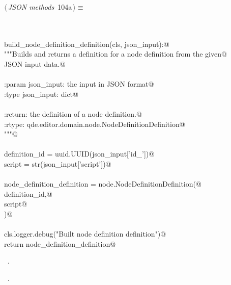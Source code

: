 \documentclass[
    a4paper,      %
    10pt,         %
    openright,    %
    notitlepage,  %
    parskip=half, %
]{scrreprt}       %
\theoremstyle{definition}                    %
\begin{document}
\begin{flushleft} \small
\begin{minipage}{\linewidth}\label{scrap169}\raggedright\small
{} $\langle\,${\itshape JSON methods}\nobreak\ {\footnotesize {104a}}$\,\rangle\equiv$
\vspace{-1exm}
\begin{list}{}{} \item
\mbox{}\lstinline@@\\
\mbox{}\lstinline@classmethod@\\
\mbox{}\lstinline@def build_node_definition_definition(cls, json_input):@\\
\mbox{}\lstinline@    """Builds and returns a definition for a node definition from the given@\\
\mbox{}\lstinline@    JSON input data.@\\
\mbox{}\lstinline@@\\
\mbox{}\lstinline@    :param json_input: the input in JSON format@\\
\mbox{}\lstinline@    :type  json_input: dict@\\
\mbox{}\lstinline@@\\
\mbox{}\lstinline@    :return: the definition of a node definition.@\\
\mbox{}\lstinline@    :rtype:  qde.editor.domain.node.NodeDefinitionDefinition@\\
\mbox{}\lstinline@    """@\\
\mbox{}\lstinline@@\\
\mbox{}\lstinline@    definition_id = uuid.UUID(json_input['id_'])@\\
\mbox{}\lstinline@    script        = str(json_input['script'])@\\
\mbox{}\lstinline@@\\
\mbox{}\lstinline@    node_definition_definition = node.NodeDefinitionDefinition(@\\
\mbox{}\lstinline@        definition_id,@\\
\mbox{}\lstinline@        script@\\
\mbox{}\lstinline@    )@\\
\mbox{}\lstinline@@\\
\mbox{}\lstinline@    cls.logger.debug("Built node definition definition")@\\
\mbox{}\lstinline@    return node_definition_definition@\\
\mbox{}\lstinline@@{\NWsep}
\end{list}
\vspace{-1.5ex}
\footnotesize
\begin{list}{}{\setlength{\itemsep}{-\parsep}\setlength{\itemindent}{-\leftmargin}}
\item \NWtxtMacroDefBy\ .
\item \NWtxtMacroRefIn\ .


\end{list}
\end{minipage}
\end{flushleft}
\end{document}
